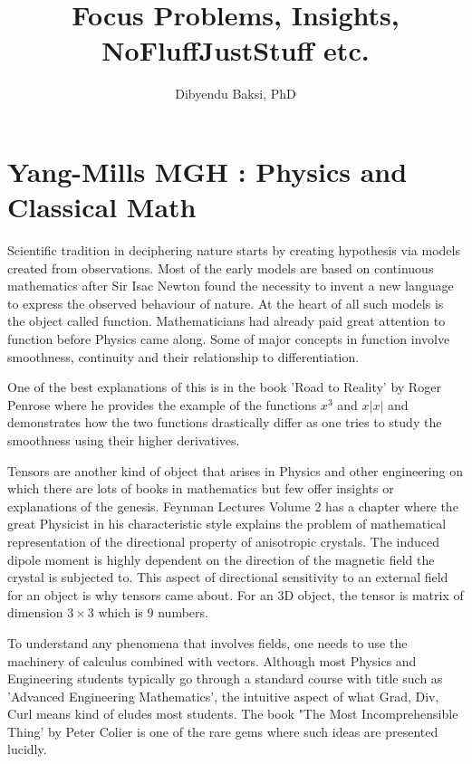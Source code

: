 \documentclass[11pt]{amsart}
\title{Focus Problems, Insights, NoFluffJustStuff etc.}
\author{Dibyendu Baksi, PhD}
\date{}                                           %
\begin{document}
\maketitle
\section{Yang-Mills MGH : Physics and Classical Math}
Scientific tradition in deciphering nature starts by creating hypothesis via models created from observations. Most of the early models are based on continuous mathematics after Sir Isac Newton found the necessity to invent a new language to express the observed behaviour of nature. At the heart of all such models is the object called function. Mathematicians had already paid great attention to function before Physics came along. Some of major concepts in function involve smoothness, continuity and their relationship to differentiation. 

One of the best explanations of this is in the book 'Road to Reality' by Roger Penrose where he provides the example of the functions $x^3$ and $x |x|$ and demonstrates how the two functions drastically differ as one tries to study the smoothness using their higher derivatives.

Tensors are another kind of object that arises in Physics and other engineering on which there are lots of books in mathematics but few offer insights or explanations of the genesis. Feynman Lectures Volume 2 has a chapter where the great Physicist in his characteristic style explains the problem of mathematical representation of the directional property of anisotropic crystals. The induced dipole moment is highly dependent on the direction of the magnetic field the crystal is subjected to. This aspect of directional sensitivity to an external field for an object is why tensors came about. For an 3D object, the tensor is matrix of dimension $3 \times 3$ which is 9 numbers. 

To understand any phenomena that involves fields, one needs to use the machinery of calculus combined with vectors. Although most Physics and Engineering students typically go through a standard course with title such as 'Advanced Engineering Mathematics', the intuitive aspect of what Grad, Div, Curl means kind of eludes most students. The book "The Most Incomprehensible Thing' by Peter Colier is one of the rare gems where such ideas are presented lucidly.
\end{document}
